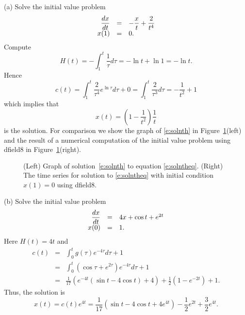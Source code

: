 \documentclass{ximera}
\begin{document}
(a)   Solve the initial value problem
\begin{equation} \label{e:solntheq}
\begin{array}{rcl}
\displaystyle \frac{dx}{dt} & = & -\displaystyle \frac{x}{t} + \frac{2}{t^4}\\
x(1) & = & 0.
\end{array}
\end{equation}
Compute
\[
H(t)= -\int_1^t\frac{1}{\tau}d\tau = -\ln t +\ln 1 = -\ln t.
\]
Hence 
\[
c(t)=\int_1^t \frac{2}{\tau^4}e^{\ln\tau}d\tau + 0
=\int_1^t \frac{2}{\tau^3} d\tau = -\frac{1}{t^2}+1
\]
which implies that 
\begin{equation}  \label{e:solnth}
x(t)=\left(1-\frac{1}{t^2}\right)\frac{1}{t}
\end{equation}
is the solution. For comparison we show the graph of \eqref{e:solnth} in 
Figure~\ref{F:solnmd}(left) and the result of a numerical computation of 
the initial value problem using {\sf dfield8} 
in Figure~\ref{F:solnmd}(right).

\begin{figure}[htb]
           \centerline{%
           }
           \caption{(Left) Graph of solution~\protect\eqref{e:solnth} to equation 
	\protect\eqref{e:solntheq}. (Right) The time series for solution to 
	\protect\eqref{e:solntheq} with initial condition $x(1)=0$ using 
	{\sf dfield8}.}
           \label{F:solnmd}
\end{figure}

\noindent (b) Solve the initial value problem
\[
\begin{array}{rcl}
\displaystyle \frac{dx}{dt} & = & 4x + \cos t + e^{2t} \\
x(0) & = & 1.
\end{array}
\]
Here $H(t)=4t$ and 
\begin{eqnarray*}
c(t) & = &  \int_0^t g(\tau)e^{-4\tau} d\tau +1\\
& = & \int_0^t \left(\cos\tau + e^{2\tau}\right)e^{-4\tau} d\tau
+1\\
& = & \frac{1}{17}\left( e^{-4t}(\sin t - 4\cos t)+4\right) +
\frac{1}{2}\left(1-e^{-2t}\right) + 1.
\end{eqnarray*}
Thus, the solution is
\[
x(t)=c(t) e^{4t} = \frac{1}{17}(\sin t - 4\cos t+4e^{4t}) -
\frac{1}{2}e^{2t} + \frac{3}{2}e^{4t}.
\]


\EXER

\TEXER 
\end{document}

